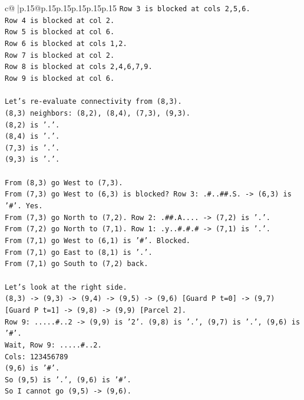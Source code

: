 \documentclass{article}
\begin{document}
{\begin{supertabular}{c@{$\;$}|p{.15\linewidth}@{}p{.15\linewidth}p{.15\linewidth}p{.15\linewidth}p{.15\linewidth}p{.15\linewidth}}
{{{\texttt{Row 3 is blocked at cols 2,5,6.} \\
\texttt{Row 4 is blocked at col 2.} \\
\texttt{Row 5 is blocked at col 6.} \\
\texttt{Row 6 is blocked at cols 1,2.} \\
\texttt{Row 7 is blocked at col 2.} \\
\texttt{Row 8 is blocked at cols 2,4,6,7,9.} \\
\texttt{Row 9 is blocked at col 6.} \\
\\ 
\texttt{Let's re{-}evaluate connectivity from (8,3).} \\
\texttt{(8,3) neighbors: (8,2), (8,4), (7,3), (9,3).} \\
\texttt{(8,2) is '.'.} \\
\texttt{(8,4) is '.'.} \\
\texttt{(7,3) is '.'.} \\
\texttt{(9,3) is '.'.} \\
\\ 
\texttt{From (8,3) go West to (7,3).} \\
\texttt{From (7,3) go West to (6,3) is blocked? Row 3: .\#..\#\#.S. {-}> (6,3) is '\#'. Yes.} \\
\texttt{From (7,3) go North to (7,2). Row 2: .\#\#.A.... {-}> (7,2) is '.'.} \\
\texttt{From (7,2) go North to (7,1). Row 1: .y..\#.\#.\# {-}> (7,1) is '.'.} \\
\texttt{From (7,1) go West to (6,1) is '\#'. Blocked.} \\
\texttt{From (7,1) go East to (8,1) is '.'.} \\
\texttt{From (7,1) go South to (7,2) back.} \\
\\ 
\texttt{Let's look at the right side.} \\
\texttt{(8,3) {-}> (9,3) {-}> (9,4) {-}> (9,5) {-}> (9,6) {[}Guard P t=0{]} {-}> (9,7) {[}Guard P t=1{]} {-}> (9,8) {-}> (9,9) {[}Parcel 2{]}.} \\
\texttt{Row 9: .....\#..2 {-}> (9,9) is '2'. (9,8) is '.', (9,7) is '.', (9,6) is '\#'.} \\
\texttt{Wait, Row 9: .....\#..2.} \\
\texttt{Cols: 123456789} \\
\texttt{(9,6) is '\#'.} \\
\texttt{So (9,5) is '.', (9,6) is '\#'.} \\
\texttt{So I cannot go (9,5) {-}> (9,6).} \\
}}}
\end{supertabular}}
\end{document}
